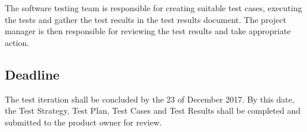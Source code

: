 \documentclass[a4paper, 12pt]{article}
\begin{document}
The software testing team is responsible for creating suitable test cases, executing the tests and gather the test results in the test results document. The project manager is then responsible for reviewing the test results and take appropriate action.

\subsection{Deadline}
The test iteration shall be concluded by the 23 of December 2017. By this date, the Test Strategy, Test Plan, Test Cases and Test Results shall be completed and submitted to the product owner for review. 
\end{document}
